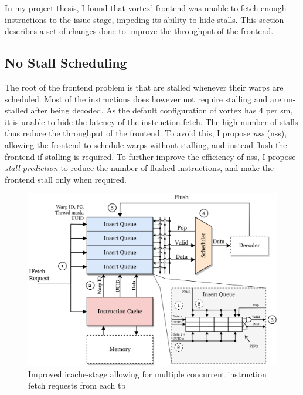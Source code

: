 In my project thesis\cite{Aurud_Project}, I found that \Gls{vortex}' frontend was unable to fetch enough instructions to the issue stage, impeding its ability to hide stalls. This section describes a set of changes done to improve the throughput of the frontend.

\subsection{No Stall Scheduling} \label{sec:no_stall_scheduling}

The root of the frontend problem is that  are stalled whenever their warps are scheduled. Most of the instructions does however not require stalling and are un-stalled after being decoded. As the default configuration of \Gls{vortex} has 4  per \acrshort{sm}, it is unable to hide the latency of the instruction fetch. The high number of stalls thus reduce the throughput of the frontend. To avoid this, I propose \textit{\acrlong{nss}} (\acrshort{nss}), allowing the frontend to schedule warps without stalling, and instead flush the frontend if stalling is required. To further improve the efficiency of \acrshort{nss}, I propose \textit{stall-prediction} to reduce the number of flushed instructions, and make the frontend stall only when required.

\begin{figure}
    \centering
    \includegraphics[width=\textwidth]{figures/new-icache-stage.png}
    \caption[Illustration of the improved icache-stage.]{Improved icache-stage allowing for multiple concurrent instruction fetch requests from each \acrshort{tb}}
    \label{fig:new_icache_stage}
\end{figure}

